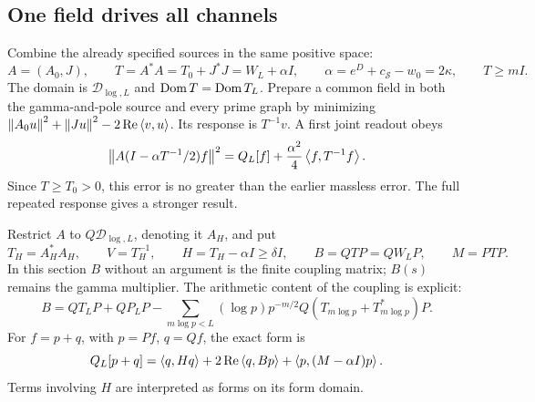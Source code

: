 \subsection{One field drives all channels}
Combine the already specified sources in the same positive space:
\begin{equation}\label{joint:reference}
A=(A_0,J),\qquad
T=A^*A=T_0+J^*J=W_L+\alpha I,\qquad
\alpha=e^D+c_{\mathcal S}-w_0=2\kappa,\qquad T\ge mI.
\end{equation}
The domain is $\mathcal D_{\log,L}$ and $\operatorname{Dom} T=\operatorname{Dom} T_L$.
Prepare a common field in both the gamma-and-pole source and
every prime graph by minimizing
$\left\lVert A_0u\right\rVert^2+\left\lVert Ju\right\rVert^2-2\operatorname{Re}\left\langle v,u\right\rangle$.
Its response is $T^{-1}v$. A first joint readout obeys
\[
\left\lVert A(I-\alpha T^{-1}/2)f\right\rVert^2
 =Q_L[f]+\frac{\alpha^2}{4}\left\langle f,T^{-1}f\right\rangle.
\]
Since $T\ge T_0>0$, this error is no greater than the earlier
massless error. The full repeated response gives a stronger result.

Restrict $A$ to $Q\mathcal D_{\log,L}$, denoting it $A_H$, and put
\[
T_H=A_H^*A_H,\qquad V=T_H^{-1},\qquad
H=T_H-\alpha I\ge\delta I,\qquad
B=QTP=QW_LP,\qquad M=PTP.
\]
In this section $B$ without an argument is the finite coupling
matrix; $B(s)$ remains the gamma multiplier.
The arithmetic content of the coupling is explicit:
\[
B=QT_LP+QP_LP-
\sum_{m\log p<L}(\log p)p^{-m/2}
                         Q(T_{m\log p}+T_{m\log p}^*)P .
\]
For $f=p+q$, with $p=Pf$, $q=Qf$, the exact form is
\begin{equation}\label{joint:blocks}
Q_L[p+q]=\left\langle q,Hq\right\rangle+2\operatorname{Re}\left\langle q,Bp\right\rangle
                          +\left\langle p,(M-\alpha I)p\right\rangle.
\end{equation}
Terms involving $H$ are interpreted as forms on its form domain.

